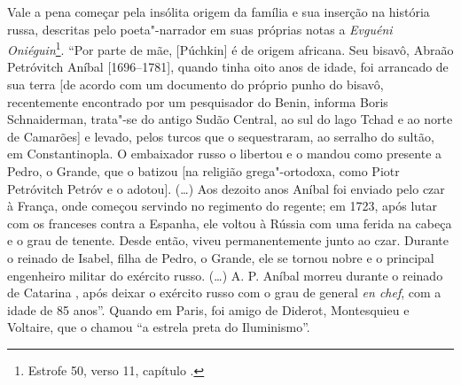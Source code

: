 Vale a pena começar pela insólita origem da família e sua inserção na
história russa, descritas pelo poeta"-narrador em suas próprias notas a
\emph{Evguéni Oniéguin}\footnote{Estrofe 50, verso 11, capítulo .}. ``Por parte
de mãe, [Púchkin] é de origem africana. Seu bisavô, Abraão
Petróvitch Aníbal [1696--1781], quando tinha oito anos de idade, foi
arrancado de sua terra [de acordo com um documento do próprio punho
do bisavô, recentemente encontrado por um pesquisador do Benin, informa
Boris Schnaiderman, trata"-se do antigo Sudão Central, ao sul do lago
Tchad e ao norte de Camarões] e levado, pelos turcos que o
sequestraram, ao serralho do sultão, em Constantinopla. O embaixador
russo o libertou e o mandou como presente a Pedro, o Grande, que o batizou [na religião grega"-ortodoxa, como Piotr
Petróvitch Petróv e o adotou]. (\ldots{}) Aos dezoito anos Aníbal foi enviado pelo czar à França, onde começou servindo no regimento do
regente; em 1723, após lutar com os franceses contra a Espanha, ele
voltou à Rússia com uma ferida na cabeça e o grau de tenente.
Desde então, viveu permanentemente junto ao czar. Durante o
reinado de Isabel, filha de Pedro, o Grande, ele se tornou nobre e o
principal engenheiro militar do exército russo. (\ldots{}) A. P. Aníbal
morreu durante o reinado de Catarina , após deixar o
exército russo com o grau de general \emph{en chef}, com a idade de 85
anos''. Quando em Paris, foi amigo de Diderot, Montesquieu e Voltaire,
que o chamou ``a estrela preta do Iluminismo''.

